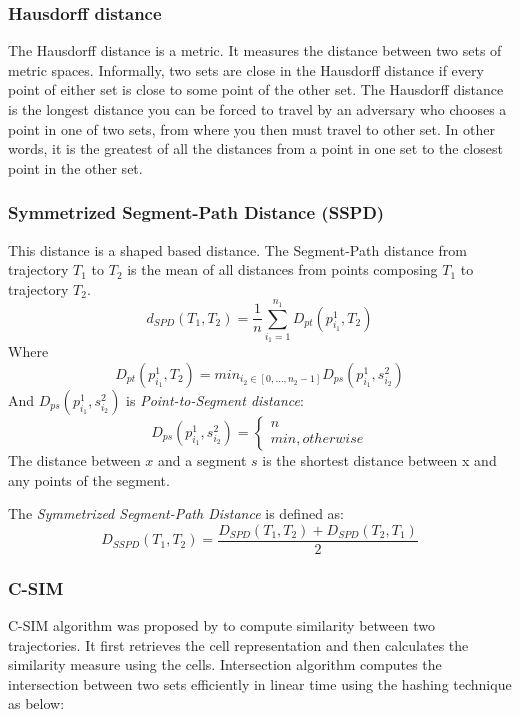\documentclass[a4paper, 12pt]{article}
\begin{document}
\subsubsection{Hausdorff distance}
The Hausdorff distance is a metric. It measures the distance between two sets of metric spaces. Informally, two sets are close in the Hausdorff distance if every point of either set is close to some point of the other set. The Hausdorff distance is the longest distance you can be forced to travel by an adversary who chooses a point in one of two sets, from where you then must travel to other set. In other words, it is the greatest of all the distances from a point in one set to the closest point in the other set.

\subsubsection{Symmetrized Segment-Path Distance (SSPD)}
This distance is a shaped based distance. The Segment-Path distance from trajectory $T_{1}$ to $T_{2}$ is the mean of all distances from points composing $T_{1}$ to trajectory $T_{2}$.
\begin{equation} \label{eq7}
    d_{SPD}(T_{1},T_{2}) = \frac{1}{n} \sum_{i_{1}=1}^{n_{1}}D_{pt}(p_{i_{1}}^1, T_{2})
\end{equation}
Where
\begin{equation} \label{eq8}
    D_{pt}(p_{i_{1}}^1, T_{2}) = min_{i_{2} \in [0,\dots,n_{2}-1]}D_{ps}(p_{i_{1}}^1, s_{i_{2}}^2)
\end{equation}
And $D_{ps}(p_{i_{1}}^1, s_{i_{2}}^2)$ is \textit{Point-to-Segment distance}:
\begin{equation} \label{eq9}
    D_{ps}(p_{i_{1}}^1, s_{i_{2}}^2) = \begin{cases}
                                            n \\
                                            min, otherwise 
                                        \end{cases}
\end{equation}
The distance between $x$ and a segment $s$ is the shortest distance between x and any points of the segment.

The \textit{Symmetrized Segment-Path Distance} is defined as:
\begin{equation} \label{eq10}
    D_{SSPD}(T_{1}, T_{2}) = \frac{D_{SPD}(T_{1}, T_{2}) + D_{SPD}(T_{2}, T_{1})}{2}
\end{equation}

\subsubsection{C-SIM}
C-SIM algorithm was proposed by \cite{mariescu2017grid} to compute similarity between two trajectories. It first retrieves the cell representation and then calculates the similarity measure using the cells. Intersection algorithm computes the intersection between two sets efficiently in linear time using the hashing technique as below:
\end{document}

